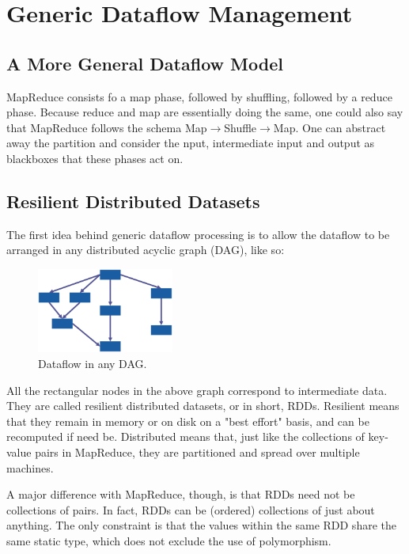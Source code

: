 \section{Generic Dataflow Management}

\subsection{A More General Dataflow Model}

MapReduce consists fo a map phase, followed by shuffling, followed by a reduce phase. Because reduce and map are essentially doing the same, one could also say that MapReduce follows the schema Map$\rightarrow$Shuffle$\rightarrow$Map. One can abstract away the partition and consider the nput, intermediate input and output as blackboxes that these phases act on.

\subsection{Resilient Distributed Datasets}
The first idea behind generic dataflow processing is to allow the dataflow to be arranged in any distributed acyclic graph (DAG), like so:

\begin{figure}[h]
    \centering
    \includegraphics[width=0.4\textwidth]{Figures/DAGSpark.png}
    \caption{Dataflow in any DAG.}\label{fig:DAG}
\end{figure}

All the rectangular nodes in the above graph correspond to intermediate data. They are called resilient distributed datasets, or in short, RDDs. Resilient means that they remain in memory or on disk on a "best effort" basis, and can be recomputed if need be. Distributed means that, just like the collections of key-value pairs in MapReduce, they are partitioned and spread over multiple machines.

A major difference with MapReduce, though, is that RDDs need not be collections of pairs. In fact, RDDs can be (ordered) collections of just about anything. The only constraint is that the values within the same RDD share the same static type, which does not exclude the use of polymorphism.


